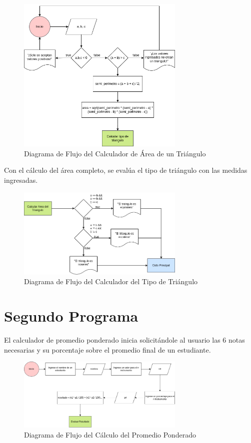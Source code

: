 \documentclass{article}
\begin{document}
\begin{figure}[h]
    \centering
    \includegraphics[width=8cm]{triangulo_area}
    \caption{Diagrama de Flujo del Calculador de Área de un Triángulo}
\end{figure}

Con el cálculo del área completo, se evalúa el tipo de triángulo con las medidas ingresadas.

\begin{figure}[h]
    \centering
    \includegraphics[width=8cm]{triangulo_tipo}
    \caption{Diagrama de Flujo del Calculador del Tipo de Triángulo}
\end{figure}

\section{Segundo Programa}

El calculador de promedio ponderado inicia solicitándole al usuario las 6 notas necesarias y su porcentaje sobre el promedio final de un estudiante.

\begin{figure}[H]
    \centering
    \includegraphics[width=8cm]{promedio_ponderado_calcular_resultado}
    \caption{Diagrama de Flujo del Cálculo del Promedio Ponderado}
\end{figure}
\end{document}
